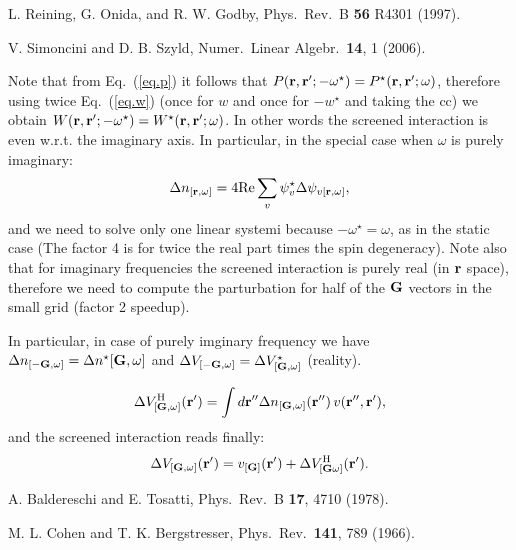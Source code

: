 \documentclass[twocolumn,prb,showpacs,superscriptaddress]{revtex4}
\def\w{\omega}
\def\G{{\bf G}}
\def\r{{\bf r}}
\def\rp{{\bf r^\prime}}
\def\rpp{{\bf r^{\prime\prime}}}
\begin{document}
\begin{thebibliography}{99}
L. Reining, G. Onida, and R. W. Godby, 
Phys.\ Rev.\ B {\bf 56} R4301 (1997).

V. Simoncini and D. B. Szyld,
Numer.\ Linear Algebr.\ {\bf 14}, 1 (2006).

Note that from Eq.\ (\ref{eq.p}) it follows that $P(\r,\rp;-\w^\star)=P^\star(\r,\rp;\w)$,
therefore using twice Eq.\ (\ref{eq.w}) (once for $w$ and once for $-w^\star$ and taking
the cc) we obtain $W(\r,\rp;-\w^\star)=W^\star(\r,\rp;\w)$. In other words
the screened interaction is even w.r.t. the imaginary axis.
In particular, in the special case when $\w$ is purely imaginary:
  \begin{equation}
  \Delta n_{[\r,\w]} = 4 {\rm Re} \sum_v \psi_v^\star \Delta \psi_{v[\r,\w]},
  \end{equation}
and we need to solve only one linear systemi because $-\w^\star=\w$,
as in the static case (The factor 4 is for twice the real part times the spin degeneracy).
Note also that for imaginary frequencies the screened interaction is purely real
(in $\r$ space), therefore we need to compute the parturbation for half of the $\G$ vectors in
the small grid (factor 2 speedup).

In particular, in case of purely imginary frequency we have 
$\Delta n_{[-\G,\w]}=\Delta n^\star{[\G,\w]}$ and $\Delta V_{[-\G,\w]}=\Delta V^\star_{[\G,\w]}$
(reality).

  \begin{equation}
  \Delta V^{\rm H}_{[\G,\w]}(\rp) = \int d\rpp \Delta n_{[\G,\w]}(\rpp) \, v(\rpp,\rp),
  \end{equation}
and the screened interaction reads finally:
  \begin{equation}
  \Delta V_{[\G,\w]}(\rp) = v_{[\G]}(\rp) + \Delta V^{\rm H}_{[\G\w]}(\rp).
  \end{equation}

A. Baldereschi and E. Tosatti,
Phys.\ Rev.\ B {\bf 17}, 4710 (1978).

M. L. Cohen and T. K. Bergstresser,
Phys.\ Rev.\ {\bf 141}, 789 (1966).

\end{thebibliography}
\end{document}
